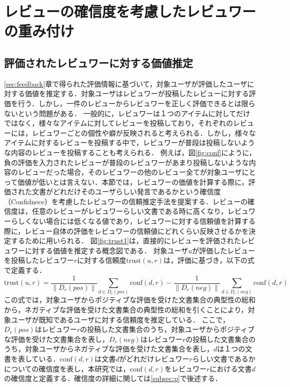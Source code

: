 \documentclass[a4paper,11pt,oneside,openany]{jsbook}
\begin{document}
	\section{レビューの確信度を考慮したレビュワーの重み付け}
	\label{sec:trust_weight}
		\subsection{評価されたレビュワーに対する価値推定}
\label{subsec:trust}
\ref{sec:feedback}章で得られた評価情報に基づいて，対象ユーザが評価したユーザに対する価値を推定する．対象ユーザはレビュワーが投稿したレビューに対する評価を行う．しかし，一件のレビューからレビュワーを正しく評価できるとは限らないという問題がある．
一般的に，レビュワーは１つのアイテムに対してだけではなく，様々なアイテムに対してレビューを投稿しており，それぞれのレビューには，レビュワーごとの個性や癖が反映されると考えられる．しかし，様々なアイテムに対するレビューを投稿する中で，レビュワーが普段は投稿しないような内容のレビューを投稿することも考えられる．
例えば，図\ref{fig:conf}にように，負の評価を入力されたレビューが普段のレビュワーがあまり投稿しないような内容のレビューだった場合，そのレビュワーの他のレビュー全てが対象ユーザにとって価値が低いとは言えない．本節では，レビュワーの価値を計算する際に，評価された文書がどれだけそのユーザらしい発言であるかという確信度（Confidnece）を考慮したレビュワーの信頼推定手法を提案する．レビューの確信度は，任意のレビューがレビュワーらしい文書である時に高くなり，レビュワーらしくない場合には低くなる値であり，レビュワーに対する信頼値を計算する際に，レビュー自体の評価をレビュワーの信頼値にどれくらい反映させるかを決定するために用いられる．
図\ref{fig:trust1}は，直接的にレビューを評価されたレビュワーに対する価値を推定する概念図である．
対象ユーザ$u$が評価したレビューを投稿したレビュワー$r$に対する信頼度$\mathrm{trust}(u, r)$は，評価に基づき，以下の式で定義する．
\begin{equation}
\mathrm{trust}(u ,r)=\frac{1}{\|D_r(pos)\|}\sum_{d\in{D_r(pos)}} \mathrm{conf}(d, r) - \frac{1}{\|D_r(neg)\|}\sum_{d\in{D_r(neg)}} \mathrm{conf}(d, r)
\end{equation}
この式では，対象ユーザからポジティブな評価を受けた文書集合の典型性の総和から，ネガティブな評価を受けた文書集合の典型性の総和を引くことにより，対象ユーザが既知であるユーザに対する信頼度を推定している．
ここで，$D_r(pos)$はレビュワー$r$の投稿した文書集合のうち，対象ユーザからポジティブな評価を受けた文書集合を表し，$D_r(neg)$はレビュワー$r$の投稿した文書集合のうち，対象ユーザからネガティブな評価を受けた文書集合を表し，$d$は１つの文書を表している．$\mathrm{conf}(d, r)$は文書$d$がどれだけレビュワー$r$らしい文書であるかについての確信度を表し，本研究では，$\mathrm{conf}(d, r)$をレビュワー$r$における文書$d$の確信度と定義する．確信度の詳細に関しては\ref{subsec:p}で後述する．
\end{document}
